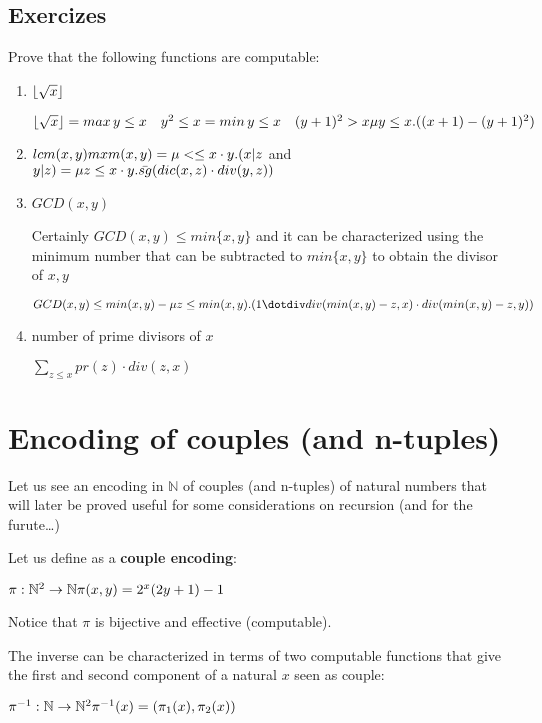 \documentclass{amsbook}
\DeclarePairedDelimiter\floor{\lfloor}{\rfloor}
\newcommand{\nat}{\ensuremath{\mathbb{N}}}
\theoremstyle{definition}
\theoremstyle{remark}
\numberwithin{section}{chapter}
\numberwithin{equation}{chapter}
\begin{document}
\subsection{Exercizes}
Prove that the following functions are computable:

\begin{enumerate}[label=\alph*)]
\item $\floor{\sqrt{x}}$
  
  $\floor{\sqrt{x}} = max\, y\leq x \quad y^2 \leq x\\
  = min \, y \leq x \quad (y+1)^2 > x\\
  \mu y\leq x. ((x+1)-(y+1)^2)$
\item $lcm(x,y)\\
  mxm(x,y) = \mu < \leq x\cdot y . (x|z $ and $ y|z)\\
  = \mu z \leq x\cdot y. \bar{sg}(dic(x,z)\cdot div(y,z))$
\item $GCD(x,y)$
  
	      Certainly $GCD(x,y)\leq min\{x,y\}$ and it can be characterized using the minimum number that can be subtracted to $min\{x,y\}$ to obtain the divisor of $x,y$

	      $GCD(x,y)\leq min(x,y)-\mu z\leq min(x,y).(1\dotdiv div(min(x,y)-z,x)\cdot div(min(x,y)-z, y))$
	\item number of prime divisors of $x$

	      $\sum_{z\leq x} pr(z)\cdot div(z,x)$
\end{enumerate}

\section{Encoding of couples (and n-tuples)}

Let us see an encoding in $\nat$ of couples (and n-tuples) of natural numbers that will later be proved useful for some considerations on recursion (and for the furute\dots)

Let us define as a \textbf{couple encoding}:

$\pi: \nat^2\rightarrow\nat\\
	\\
	\pi(x,y) = 2^x(2y+1)-1$

Notice that $\pi$ is bijective and effective (computable).

The inverse can be characterized in terms of two computable functions that give the first and second component of a natural $x$ seen as couple:

$\pi^{-1}:\nat\rightarrow\nat^2\\
	\\
	\pi^{-1}(x) = (\pi_1(x),\pi_2(x))$
\end{document}
